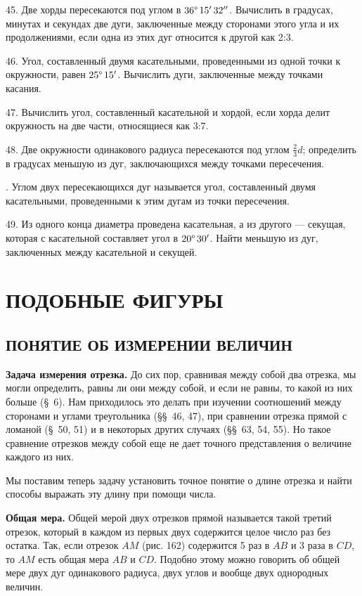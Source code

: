 \documentclass[oneside]{book}
\begin{document}
45.
Две хорды пересекаются под углом в $36\degree\, 15'\, 32''$.
Вычислить в градусах, минутах и секундах две дуги, заключенные между сторонами этого угла и их продолжениями, если одна из этих дуг относится к другой как 2:3.

46.
Угол, составленный двумя касательными, проведенными из одной точки к окружности, равен $25\degree\,15'$.
Вычислить дуги, заключенные между точками касания.

47.
Вычислить угол, составленный касательной и хордой, если хорда делит окружность на две части, относящиеся как 3:7.

48.
Две окружности одинакового радиуса пересекаются под углом $\tfrac23d$;
определить в градусах меньшую из дуг, заключающихся между точками пересечения.

.
Углом двух пересекающихся дуг называется угол, составленный двумя касательными, проведенными к этим дугам из точки пересечения.

49.
Из одного конца диаметра проведена касательная, а из другого — секущая, которая с касательной составляет угол в $20\degree\,30'$.
Найти меньшую из дуг, заключенных между касательной и секущей.

\chapter{ПОДОБНЫЕ ФИГУРЫ}

\section{ПОНЯТИЕ ОБ ИЗМЕРЕНИИ ВЕЛИЧИН}

\textbf{Задача измерения отрезка.}
До сих пор, сравнивая между собой два отрезка, мы могли определить, равны ли они между собой, и если не равны, то какой из них больше (§~6).
Нам приходилось это делать при изучении соотношений между сторонами и углами треугольника (§§~46, 47), при сравнении отрезка прямой с ломаной (§~50, 51) и в некоторых других случаях (§§~63, 54, 55).
Но такое сравнение отрезков между собой еще не дает точного представления о величине каждого из них.

Мы поставим теперь задачу установить точное понятие о длине отрезка и найти способы выражать эту длину при помощи числа.

\textbf{Общая мера.}
Общей мерой двух отрезков прямой называется такой третий отрезок, который в каждом из первых двух содержится целое число раз без остатка.
Так, если отрезок $AM$ (рис. 162) содержится 5 раз в $AB$ и 3 раза в $CD$, то $AM$ есть общая мера $AB$ и $CD$.
Подобно этому можно говорить об общей мере двух дуг одинакового радиуса, двух углов и вообще двух однородных величин.
\end{document}

